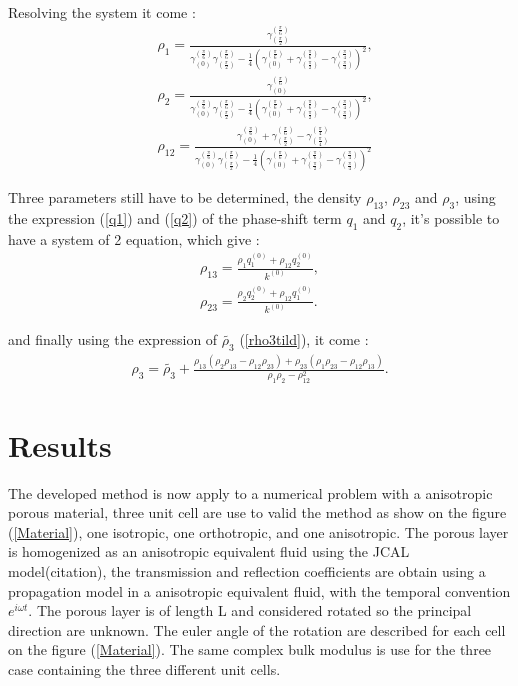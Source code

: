 \documentclass{article}
\begin{document}
    Resolving the system it come :
    \begin{align}
        &\rho_1=\frac{\gamma^{(\frac{\pi}{6})}_{(\frac{\pi}{2})}}{\gamma^{(\frac{\pi}{6})}_{(0)}\gamma^{(\frac{\pi}{6})}_{(\frac{\pi}{2})}-\frac{1}{4}(\gamma^{(\frac{\pi}{6})}_{(0)}+\gamma^{(\frac{\pi}{6})}_{(\frac{\pi}{2})}-\gamma^{(\frac{\pi}{4})}_{(\frac{\pi}{4})})^2},\\
        &\rho_2=\frac{\gamma^{(\frac{\pi}{6})}_{(0)}}{\gamma^{(\frac{\pi}{6})}_{(0)}\gamma^{(\frac{\pi}{6})}_{(\frac{\pi}{2})}-\frac{1}{4}(\gamma^{(\frac{\pi}{6})}_{(0)}+\gamma^{(\frac{\pi}{6})}_{(\frac{\pi}{2})}-\gamma^{(\frac{\pi}{4})}_{(\frac{\pi}{4})})^2},\\
        &\rho_{12}=\frac{\gamma^{(\frac{\pi}{6})}_{(0)}+\gamma^{(\frac{\pi}{6})}_{(\frac{\pi}{2})}-\gamma^{(\frac{\pi}{4})}_{(\frac{\pi}{4})}}{\gamma^{(\frac{\pi}{6})}_{(0)}\gamma^{(\frac{\pi}{6})}_{(\frac{\pi}{2})}-\frac{1}{4}(\gamma^{(\frac{\pi}{6})}_{(0)}+\gamma^{(\frac{\pi}{6})}_{(\frac{\pi}{2})}-\gamma^{(\frac{\pi}{4})}_{(\frac{\pi}{4})})^2}
    \end{align}
    
    Three parameters still have to be determined, the density $\rho_{13}$, $\rho_{23}$ and $\rho_3$, using the expression (\ref{q1}) and (\ref{q2}) of the phase-shift term $q_1$ and $q_2$, it's possible to have a system of 2 equation, which give :
    \begin{align}
    \rho_{13}=\frac{\rho_1q_1^{(0)}+\rho_{12}q_2^{(0)}}{k^{(0)}},\\
    \rho_{23}=\frac{\rho_2q_2^{(0)}+\rho_{12}q_1^{(0)}}{k^{(0)}}.
    \end{align}
    
    and finally using the expression of $\tilde{\rho_3}$ (\ref{rho3tild}), it come :
    \begin{align}
    \rho_3=\tilde{\rho_3}+\frac{\rho_{13}(\rho_2\rho_{13}-\rho_{12}\rho_{23})+\rho_{23}(\rho_1\rho_{23}-\rho_{12}\rho_{13})}{\rho_1\rho_2-\rho_{12}^2}.
    \end{align}

    
\section{Results}
    The developed method is now apply to a numerical problem with a anisotropic porous material, three unit cell are use to valid the method as show on the figure (\ref{Material}), one isotropic, one orthotropic, and one anisotropic. The porous layer is homogenized as an anisotropic equivalent fluid using the JCAL model(citation), the transmission and reflection coefficients are obtain using a propagation model in a anisotropic equivalent fluid, with the temporal convention $e^{i\omega t}$. The porous layer is of length L and considered rotated so the principal direction are unknown. The euler angle of the rotation are described for each cell on the figure (\ref{Material}). The same complex bulk modulus is use for the three case containing the three different unit cells. 
    
\end{document}
